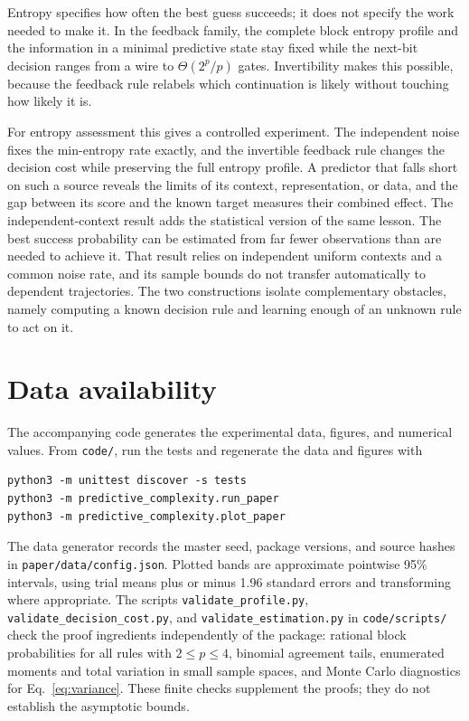\documentclass[11pt,a4paper]{article}
\begin{document}
Entropy specifies how often the best guess succeeds; it does not specify the work needed to make it. In the feedback family, the complete block entropy profile and the information in a minimal predictive state stay fixed while the next-bit decision ranges from a wire to \(\Theta(2^p/p)\) gates. Invertibility makes this possible, because the feedback rule relabels which continuation is likely without touching how likely it is.

For entropy assessment this gives a controlled experiment. The independent noise fixes the min-entropy rate exactly, and the invertible feedback rule changes the decision cost while preserving the full entropy profile. A predictor that falls short on such a source reveals the limits of its context, representation, or data, and the gap between its score and the known target measures their combined effect. The independent-context result adds the statistical version of the same lesson. The best success probability can be estimated from far fewer observations than are needed to achieve it. That result relies on independent uniform contexts and a common noise rate, and its sample bounds do not transfer automatically to dependent trajectories. The two constructions isolate complementary obstacles, namely computing a known decision rule and learning enough of an unknown rule to act on it.

\section*{Data availability}
The accompanying code generates the experimental data, figures, and numerical values. From \texttt{code/}, run the tests and regenerate the data and figures with
\begin{verbatim}
python3 -m unittest discover -s tests
python3 -m predictive_complexity.run_paper
python3 -m predictive_complexity.plot_paper
\end{verbatim}
The data generator records the master seed, package versions, and source hashes in \texttt{paper/data/config.json}. Plotted bands are approximate pointwise 95\% intervals, using trial means plus or minus 1.96 standard errors and transforming where appropriate. The scripts \texttt{validate\_profile.py}, \texttt{validate\_decision\_cost.py}, and \texttt{validate\_estimation.py} in \texttt{code/scripts/} check the proof ingredients independently of the package: rational block probabilities for all rules with \(2\le p\le4\), binomial agreement tails, enumerated moments and total variation in small sample spaces, and Monte Carlo diagnostics for Eq.~\eqref{eq:variance}. These finite checks supplement the proofs; they do not establish the asymptotic bounds.
\end{document}
